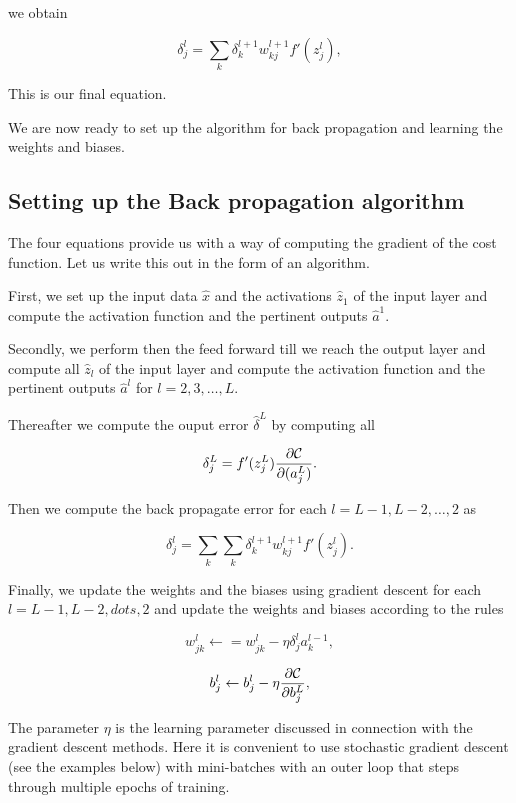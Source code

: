 \documentclass[11pt]{article}
\begin{document}
    we obtain

    \[
\delta_j^l =\sum_k \delta_k^{l+1}w_{kj}^{l+1}f'(z_j^l),
\]

    This is our final equation.

We are now ready to set up the algorithm for back propagation and
learning the weights and biases.

\hypertarget{setting-up-the-back-propagation-algorithm}{%
\subsection{Setting up the Back propagation
algorithm}\label{setting-up-the-back-propagation-algorithm}}

The four equations provide us with a way of computing the gradient of
the cost function. Let us write this out in the form of an algorithm.

First, we set up the input data \(\hat{x}\) and the activations
\(\hat{z}_1\) of the input layer and compute the activation function and
the pertinent outputs \(\hat{a}^1\).

Secondly, we perform then the feed forward till we reach the output
layer and compute all \(\hat{z}_l\) of the input layer and compute the
activation function and the pertinent outputs \(\hat{a}^l\) for
\(l=2,3,\dots,L\).

Thereafter we compute the ouput error \(\hat{\delta}^L\) by computing
all

    \[
\delta_j^L = f'(z_j^L)\frac{\partial {\cal C}}{\partial (a_j^L)}.
\]

    Then we compute the back propagate error for each \(l=L-1,L-2,\dots,2\)
as

    \[
\delta_j^l =\sum_k \sum_k \delta_k^{l+1}w_{kj}^{l+1}f'(z_j^l).
\]

    Finally, we update the weights and the biases using gradient descent for
each \(l=L-1,L-2,dots,2\) and update the weights and biases according to
the rules

    \[
w_{jk}^l\leftarrow  = w_{jk}^l- \eta \delta_j^la_k^{l-1},
\]

    \[
b_j^l \leftarrow b_j^l-\eta \frac{\partial {\cal C}}{\partial b_j^L},
\]

    The parameter \(\eta\) is the learning parameter discussed in connection
with the gradient descent methods. Here it is convenient to use
stochastic gradient descent (see the examples below) with mini-batches
with an outer loop that steps through multiple epochs of training.
\end{document}
